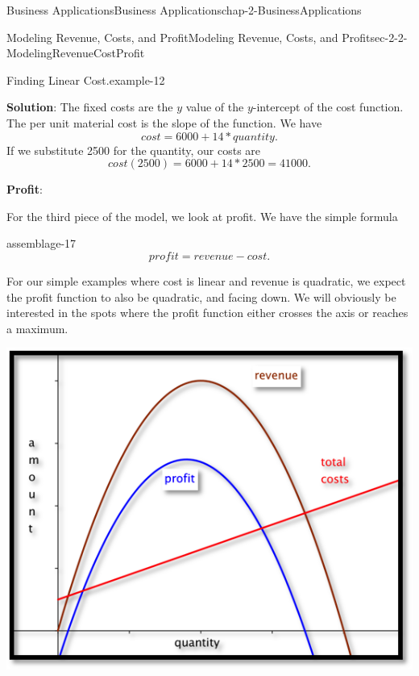 \documentclass[oneside,10pt,]{book}
\newcommand{\terminology}[1]{\textbf{#1}}
\numberwithin{equation}{section}
\begin{document}
\begin{chapterptx}{Business Applications}{}{Business Applications}{}{}{chap-2-BusinessApplications}
\begin{sectionptx}{Modeling Revenue, Costs, and Profit}{}{Modeling Revenue, Costs, and Profit}{}{}{sec-2-2-ModelingRevenueCostProfit}
\begin{example}{Finding Linear Cost.}{example-12}
\par
\hypertarget{p-654}{}%
\terminology{Solution}: The fixed costs are the \(y\) value of the \(y\)-intercept of the cost function.  The per unit material cost is the slope of the function.  We have%
%
\begin{equation*}
cost=6000+14*quantity.
\end{equation*}
\hypertarget{p-655}{}%
If we substitute 2500 for the quantity, our costs are%
%
\begin{equation*}
cost(2500)=6000+14*2500=41000.
\end{equation*}
\end{example}
\hypertarget{p-656}{}%
\terminology{Profit}:%
\par
\hypertarget{p-657}{}%
For the third piece of the model, we look at profit.  We have the simple formula%
\begin{assemblage}{}{assemblage-17}%
\hypertarget{p-658}{}%
%
\begin{equation*}
profit=revenue-cost.
\end{equation*}
%
\end{assemblage}
\hypertarget{p-659}{}%
For our simple examples where cost is linear and revenue is quadratic, we expect the profit function to also be quadratic, and facing down.  We will obviously be interested in the spots where the profit function either crosses the axis or reaches a maximum.%
\begin{sidebyside}{1}{0.2}{0.2}{0}%
\begin{sbspanel}{0.6}%
\includegraphics[width=1\linewidth]{images/sec2-2-6.png}

\end{sbspanel}
\end{sidebyside}
\end{sectionptx}
\end{chapterptx}
\end{document}
